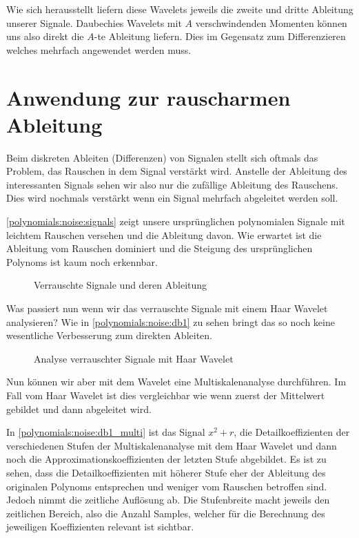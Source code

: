 \begin{refsection}
Wie sich herausstellt liefern diese Wavelets jeweils die zweite und dritte
Ableitung unserer Signale. Daubechies Wavelets mit $A$ verschwindenden Momenten
können uns also direkt die $A$-te Ableitung liefern. Dies im Gegensatz zum
Differenzieren welches mehrfach angewendet werden muss.

\section{Anwendung zur rauscharmen Ableitung}

Beim diskreten Ableiten (Differenzen) von Signalen stellt sich oftmals das
Problem, das Rauschen in dem Signal verstärkt wird. Anstelle der Ableitung des
interessanten Signals sehen wir also nur die zufällige Ableitung des Rauschens.
Dies wird nochmals verstärkt wenn ein Signal mehrfach abgeleitet werden soll.

\autoref{polynomials:noise:signals} zeigt unsere ursprünglichen polynomialen
Signale mit leichtem Rauschen versehen und die Ableitung davon. Wie erwartet
ist die Ableitung vom Rauschen dominiert und die Steigung des ursprünglichen
Polynoms ist kaum noch erkennbar.

\begin{figure}
    \centering
    
    \caption{Verrauschte Signale und deren Ableitung\label{polynomials:noise:signals}}
\end{figure}

Was passiert nun wenn wir das verrauschte Signale mit einem Haar Wavelet
analysieren?  Wie in \autoref{polynomials:noise:db1} zu sehen bringt das so
noch keine wesentliche Verbesserung zum direkten Ableiten.

\begin{figure}
    \centering
    
    \caption{Analyse verrauschter Signale mit Haar Wavelet\label{polynomials:noise:db1}}
\end{figure}

Nun können wir aber mit dem Wavelet eine Multiskalenanalyse durchführen. Im
Fall vom Haar Wavelet ist dies vergleichbar wie wenn zuerst der Mittelwert
gebildet und dann abgeleitet wird.

In \autoref{polynomials:noise:db1_multi} ist das Signal $x^2 + r$, die
Detailkoeffizienten der verschiedenen Stufen der Multiskalenanalyse mit dem
Haar Wavelet und dann noch die Approximationskoeffizienten der letzten Stufe
abgebildet. Es ist zu sehen, dass die Detailkoeffizienten mit höherer Stufe
eher der Ableitung des originalen Polynoms entsprechen und weniger vom Rauschen
betroffen sind. Jedoch nimmt die zeitliche Auflösung ab.
Die Stufenbreite macht jeweils den zeitlichen Bereich, also die Anzahl Samples,
welcher für die Berechnung des jeweiligen Koeffizienten relevant ist sichtbar.


\end{refsection}
